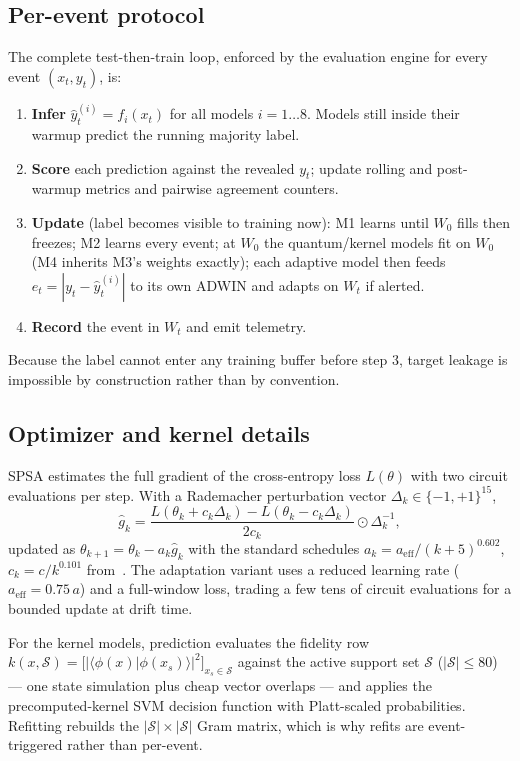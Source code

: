 \documentclass[conference]{IEEEtran}
\begin{document}
\subsection{Per-event protocol}
The complete test-then-train loop, enforced by the evaluation engine for every event
$(x_t, y_t)$, is:
\begin{enumerate}
  \item \textbf{Infer} $\hat{y}_t^{(i)} = f_i(x_t)$ for all models $i = 1 \dots 8$.
    Models still inside their warmup predict the running majority label.
  \item \textbf{Score} each prediction against the revealed $y_t$; update rolling and
    post-warmup metrics and pairwise agreement counters.
  \item \textbf{Update} (label becomes visible to training now): M1 learns until $W_0$
    fills then freezes; M2 learns every event; at $W_0$ the quantum/kernel models fit on
    $W_0$ (M4 inherits M3's weights exactly); each adaptive model then feeds
    $e_t = |y_t - \hat{y}_t^{(i)}|$ to its own ADWIN and adapts on $W_t$ if alerted.
  \item \textbf{Record} the event in $W_t$ and emit telemetry.
\end{enumerate}
Because the label cannot enter any training buffer before step 3, target leakage is
impossible by construction rather than by convention.

\subsection{Optimizer and kernel details}
SPSA estimates the full gradient of the cross-entropy loss $L(\theta)$ with two circuit
evaluations per step. With a Rademacher perturbation vector $\Delta_k \in \{-1,+1\}^{15}$,
\begin{equation}
\hat{g}_k = \frac{L(\theta_k + c_k \Delta_k) - L(\theta_k - c_k \Delta_k)}{2 c_k}
\odot \Delta_k^{-1},
\end{equation}
updated as $\theta_{k+1} = \theta_k - a_k \hat{g}_k$ with the standard schedules
$a_k = a_{\text{eff}}/(k+5)^{0.602}$, $c_k = c/k^{0.101}$ from~\cite{spall1992}. The
adaptation variant uses a reduced learning rate ($a_{\text{eff}} = 0.75\,a$) and a full-window
loss, trading a few tens of circuit evaluations for a bounded update at drift time.

For the kernel models, prediction evaluates the fidelity row
$k(x, \mathcal{S}) = \big[ |\langle\phi(x)|\phi(x_s)\rangle|^2 \big]_{x_s \in \mathcal{S}}$
against the active support set $\mathcal{S}$ ($|\mathcal{S}| \le 80$) --- one state
simulation plus cheap vector overlaps --- and applies the precomputed-kernel SVM decision
function with Platt-scaled probabilities. Refitting rebuilds the $|\mathcal{S}| \times
|\mathcal{S}|$ Gram matrix, which is why refits are event-triggered rather than per-event.
\end{document}
